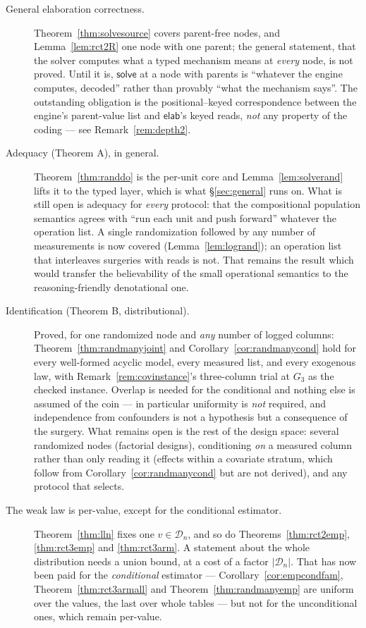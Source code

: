 \documentclass[11pt,a4paper]{article}
\theoremstyle{definition}
\theoremstyle{plain}
\theoremstyle{remark}
\newcommand{\dom}{\mathcal{D}}
\newcommand{\solve}{\mathsf{solve}}
\newcommand{\elab}{\mathsf{elab}}
\begin{document}
\begin{description}
\item[General elaboration correctness.] Theorem~\ref{thm:solvesource}
  covers parent-free nodes, and Lemma~\ref{lem:rct2R} one node with one
  parent; the general statement, that the solver computes what a typed
  mechanism means at \emph{every} node, is not proved. Until it is,
  $\solve$ at a node with parents is ``whatever the engine computes,
  decoded'' rather than provably ``what the mechanism says''. The
  outstanding obligation is the positional--keyed correspondence between
  the engine's parent-value list and $\elab$'s keyed reads, \emph{not} any
  property of the coding --- see Remark~\ref{rem:depth2}.

\item[Adequacy (Theorem A), in general.] Theorem~\ref{thm:randdo} is the
  per-unit core and Lemma~\ref{lem:solverand} lifts it to the typed
  layer, which is what \S\ref{sec:general} runs on. What is still open is
  adequacy for \emph{every} protocol: that the compositional population
  semantics agrees with ``run each unit and push forward'' whatever the
  operation list. A single randomization followed by any number of
  measurements is now covered (Lemma~\ref{lem:logrand}); an operation
  list that interleaves surgeries with reads is not. That remains the result which would transfer the
  believability of the small operational semantics to the
  reasoning-friendly denotational one.

\item[Identification (Theorem B, distributional).] Proved, for one
  randomized node and \emph{any} number of logged columns:
  Theorem~\ref{thm:randmanyjoint} and Corollary~\ref{cor:randmanycond}
  hold for every well-formed acyclic model, every measured list, and
  every exogenous law, with Remark~\ref{rem:covinstance}'s three-column
  trial at $G_3$ as the checked instance. Overlap is needed for the
  conditional and nothing else is assumed of the coin --- in particular
  uniformity is \emph{not} required, and independence from confounders is
  not a hypothesis but a consequence of the surgery. What remains open is
  the rest of the design space: several randomized nodes (factorial
  designs), conditioning \emph{on} a measured column rather than only
  reading it (effects within a covariate stratum, which follow from
  Corollary~\ref{cor:randmanycond} but are not derived), and any protocol
  that selects.

\item[The weak law is per-value, except for the conditional estimator.]
  Theorem~\ref{thm:lln} fixes one $v \in \dom_n$, and so do
  Theorems~\ref{thm:rct2emp}, \ref{thm:rct3emp} and \ref{thm:rct3arm}. A
  statement about the whole distribution needs a union bound, at a cost of
  a factor $|\dom_n|$. That has now been paid for the \emph{conditional}
  estimator --- Corollary~\ref{cor:empcondfam},
  Theorem~\ref{thm:rct3armall} and Theorem~\ref{thm:randmanyemp} are
  uniform over the values, the last over whole tables --- but not for the
  unconditional ones, which remain per-value.


\end{description}
\end{document}
